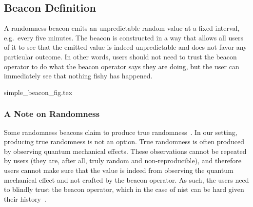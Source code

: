





\subsection{Beacon Definition}

A randomness beacon emits an unpredictable random value at a fixed interval, e.g.\ every five minutes.
The beacon is constructed in a way that allows all users of it to see that the emitted value is indeed unpredictable and does not favor any particular outcome.
In other words, users should not need to trust the beacon operator to do what the beacon operator says they are doing, but the user can immediately see that nothing fishy has happened.

{simple_beacon_fig.tex}

\subsubsection{A Note on Randomness}
Some randomness beacons claim to produce true randomness~\cite{nistbeacon}.
In our setting, producing true randomness is not an option.
True randomness is often produced by observing quantum mechanical effects.
These observations cannot be repeated by users (they are, after all, truly random and non-reproducible), and therefore users cannot make sure that the value is indeed from observing the quantum mechanical effect and not crafted by the beacon operator.
As such, the users need to blindly trust the beacon operator, which in the case of \gls{nist} can be hard given their history~\cite{nytimes-nsabackdoors, nytimes-nsaconstants, nist2014backdoor}.

